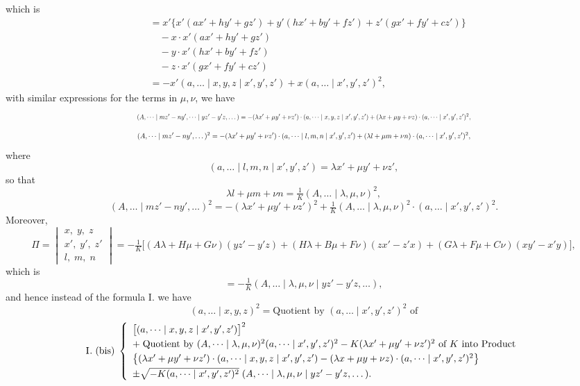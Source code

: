 \documentclass[11pt]{article}
\begin{document}
which is
\[ \begin{aligned}
&= x'\bigl\{x'(ax'+hy'+gz')+y'(hx'+by'+fz')+z'(gx'+fy'+cz')\bigr\}\\
&\quad -x\cdot x'(ax'+hy'+gz')\\
&\quad -y\cdot x'(hx'+by'+fz')\\
&\quad -z\cdot x'(gx'+fy'+cz')\\
&= -x'(a,\dots \mid x,y,z \mid x',y',z')+x(a,\dots \mid x',y',z')^{2},
\end{aligned} \]
with similar expressions for the terms in $\mu,\nu$, we have
\[ \resizebox{\textwidth}{!}{$\displaystyle
(A,\dots \mid mz'-ny',\dots \mid yz'-y'z,\dots)
= -(\lambda x'+\mu y'+\nu z')\cdot(a,\dots \mid x,y,z \mid x',y',z')+(\lambda x+\mu y+\nu z)\cdot(a,\dots \mid x',y',z')^{2},$} \]
\[ \resizebox{\textwidth}{!}{$\displaystyle
(A,\dots \mid mz'-ny',\dots)^{2}=-(\lambda x'+\mu y'+\nu z')\cdot(a,\dots \mid l,m,n \mid x',y',z')+(\lambda l+\mu m+\nu n)\cdot(a,\dots \mid x',y',z')^{2},$} \]
where
\[ (a,\dots \mid l,m,n \mid x',y',z')=\lambda x'+\mu y'+\nu z', \]
so that
\[ \lambda l+\mu m+\nu n=\tfrac{1}{K}(A,\dots \mid \lambda,\mu,\nu)^{2}, \]
\[ (A,\dots \mid mz'-ny',\dots)^{2}=-(\lambda x'+\mu y'+\nu z')^{2}+\tfrac{1}{K}(A,\dots \mid \lambda,\mu,\nu)^{2}\cdot(a,\dots \mid x',y',z')^{2}. \]
Moreover,
\[ \Pi=\begin{vmatrix}
x,\;y,\;z\\
x',\;y',\;z'\\
l,\;m,\;n
\end{vmatrix}
= -\tfrac{1}{K}\bigl[(A\lambda+H\mu+G\nu)(yz'-y'z)+(H\lambda+B\mu+F\nu)(zx'-z'x)+(G\lambda+F\mu+C\nu)(xy'-x'y)\bigr], \]
which is
\[ = -\tfrac{1}{K}(A,\dots \mid \lambda,\mu,\nu \mid yz'-y'z,\dots), \]
and hence instead of the formula \textsc{I.} we have
\[ (a,\dots \mid x,y,z)^{2}=\text{Quotient by }(a,\dots \mid x',y',z')^{2}\text{ of} \]
\[ \textsc{I.}\;(\text{bis})\;\left\{\begin{array}{l}
\bigl[(a,\dots \mid x,y,z \mid x',y',z')\bigr]^{2}\\[0.3em]
+\;\text{Quotient by }(A,\dots \mid \lambda,\mu,\nu)^{2}(a,\dots \mid x',y',z')^{2}-K(\lambda x'+\mu y'+\nu z')^{2}\text{ of }K\text{ into Product}\\[0.3em]
\bigl\{(\lambda x'+\mu y'+\nu z')\cdot(a,\dots \mid x,y,z \mid x',y',z')-(\lambda x+\mu y+\nu z)\cdot(a,\dots \mid x',y',z')^{2}\bigr\}\\[0.3em]
\pm\sqrt{-K(a,\dots \mid x',y',z')^{2}}\;(A,\dots \mid \lambda,\mu,\nu \mid yz'-y'z,\dots).
\end{array}\right. \]
\end{document}
